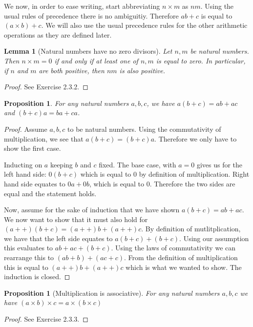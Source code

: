 \documentclass[a4paper, twocolumn]{report}
\newcounter{dummy} \numberwithin{dummy}{section}
\newtheorem{prp}[dummy]{Proposition}
\newtheorem{lma}[dummy]{Lemma}
\theoremstyle{definition}
\theoremstyle{solution}
\newcommand{\dplus}{{+}{+}} %
\begin{document}
We now, in order to ease writing, start abbreviating $n \times m$ as $nm$.
Using the usual rules of precedence there is no ambiguitiy. Therefore $ab + c$
is equal to $(a\times b) + c$. We will also use the usual precedence rules for
the other arithmetic operations as they are defined later.

\begin{lma}[Natural numbers have no zero divisors]
  \label{lma_233}
  Let $n, m$ be natural numbers. Then $n \times m = 0$ if and only if at least
  one of $n, m$ is equal to zero.  In particular, if $n$ and $m$ are both
  positive, then $nm$ is also positive. 
\end{lma}
\begin{proof}
  See Exercise 2.3.2.
\end{proof}

\begin{prp}
  \label{prp_234}
  For any natural numbers $a, b, c$, we have $a(b+c) = ab + ac$ and $(b+c)a =
  ba + ca$.
\end{prp}

\begin{proof}
  Assume $a, b, c$ to be natural numbers.  Using the commutativity of
  multiplication, we see that $a(b+c) = (b+c)a$.  Therefore we only have to
  show the first case.

  Inducting on $a$ keeping $b$ and $c$ fixed.  The base case, with $a = 0$
  gives us for the left hand side: $0(b+c)$ which is equal to $0$ by definition
  of multiplication. Right hand side equates to $0a + 0b$, which is equal to
  $0$. Therefore the two sides are equal and the statement holds.

  Now, assume for the sake of induction that we have shown $a(b+c) = ab + ac$.
  We now want to show that it must also hold for $(a\dplus)(b+c) = (a\dplus)b +
  (a\dplus)c$.  By definition of mutlitplication, we have that the left side
  equates to $a(b+c) + (b+c)$. Using our assumption this evaluates to $ab + ac
  + (b+c)$.  Using the laws of commutativity we can rearrange this to $(ab + b)
  + (ac + c)$.  From the definition of multiplication this is equal to
  $(a\dplus)b + (a\dplus)c$ which is what we wanted to show. The induction is
  closed.
\end{proof}

\begin{prp}[Multiplication is associative]
  \label{prp_235} 
  For any natural numbers $a, b, c$ we have $(a\times b) \times c = a \times
  (b\times c)$
\end{prp}
\begin{proof}
  See Exercise 2.3.3.
\end{proof}
\end{document}
